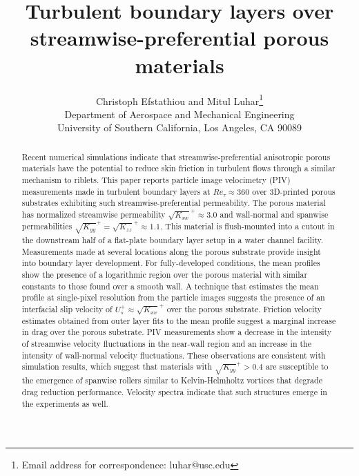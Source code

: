 \documentclass[letterpaper,11pt]{article}
\title{Turbulent boundary layers over streamwise-preferential porous materials}
\author{Christoph Efstathiou and Mitul Luhar\thanks{Email address for correspondence: luhar@usc.edu} \\ 
Department of Aerospace and Mechanical Engineering \\ University of Southern California, Los Angeles, CA 90089}
\newcommand{\kpxx}{\sqrt{K_{xx}}^+}
\newcommand{\kpyy}{\sqrt{K_{yy}}^+}
\newcommand{\kpzz}{\sqrt{K_{zz}}^+}
\newcommand{\Ret}{Re_\tau}
\begin{document}
\maketitle

\begin{abstract}
Recent numerical simulations indicate that streamwise-preferential anisotropic porous materials have the potential to reduce skin friction in turbulent flows through a similar mechanism to riblets.  This paper reports particle image velocimetry (PIV) measurements made in turbulent boundary layers at $\Ret \approx 360$ over 3D-printed porous substrates exhibiting such streamwise-preferential permeability.  The porous material has normalized streamwise permeability $\kpxx \approx 3.0$  and wall-normal and spanwise permeabilities $\kpyy = \kpzz \approx 1.1$.  This material is flush-mounted into a cutout in the downstream half of a flat-plate boundary layer setup in a water channel facility.  Measurements made at several locations along the porous substrate provide insight into boundary layer development. For fully-developed conditions, the mean profiles show the presence of a logarithmic region over the porous material with similar constants to those found over a smooth wall. A technique that estimates the mean profile at single-pixel resolution from the particle images suggests the presence of an interfacial slip velocity of $U_s^+ \approx \kpxx$ over the porous substrate. Friction velocity estimates obtained from outer layer fits to the mean profile suggest a marginal increase in drag over the porous substrate. PIV measurements show a decrease in the intensity of streamwise velocity fluctuations in the near-wall region and an increase in the intensity of wall-normal velocity fluctuations. These observations are consistent with simulation results, which suggest that materials with $\kpyy > 0.4$ are susceptible to the emergence of spanwise rollers similar to Kelvin-Helmholtz vortices that degrade drag reduction performance. Velocity spectra indicate that such structures emerge in the experiments as well.
\end{abstract}
\end{document}

